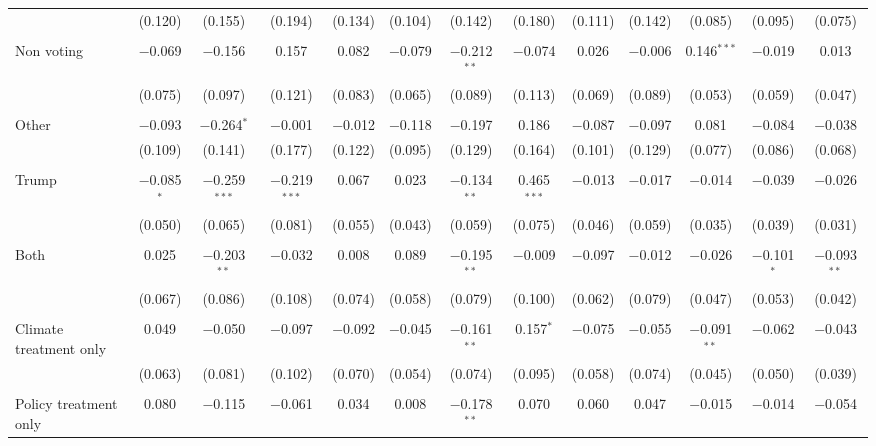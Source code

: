 \begin{tabular}{@{\extracolsep{5pt}}lcccccccccccc}
  & (0.120) & (0.155) & (0.194) & (0.134) & (0.104) & (0.142) & (0.180) & (0.111) & (0.142) & (0.085) & (0.095) & (0.075) \\ 
  & & & & & & & & & & & & \\ 
 Non voting & $-$0.069 & $-$0.156 & 0.157 & 0.082 & $-$0.079 & $-$0.212$^{**}$ & $-$0.074 & 0.026 & $-$0.006 & 0.146$^{***}$ & $-$0.019 & 0.013 \\ 
  & (0.075) & (0.097) & (0.121) & (0.083) & (0.065) & (0.089) & (0.113) & (0.069) & (0.089) & (0.053) & (0.059) & (0.047) \\ 
  & & & & & & & & & & & & \\ 
 Other & $-$0.093 & $-$0.264$^{*}$ & $-$0.001 & $-$0.012 & $-$0.118 & $-$0.197 & 0.186 & $-$0.087 & $-$0.097 & 0.081 & $-$0.084 & $-$0.038 \\ 
  & (0.109) & (0.141) & (0.177) & (0.122) & (0.095) & (0.129) & (0.164) & (0.101) & (0.129) & (0.077) & (0.086) & (0.068) \\ 
  & & & & & & & & & & & & \\ 
 Trump & $-$0.085$^{*}$ & $-$0.259$^{***}$ & $-$0.219$^{***}$ & 0.067 & 0.023 & $-$0.134$^{**}$ & 0.465$^{***}$ & $-$0.013 & $-$0.017 & $-$0.014 & $-$0.039 & $-$0.026 \\ 
  & (0.050) & (0.065) & (0.081) & (0.055) & (0.043) & (0.059) & (0.075) & (0.046) & (0.059) & (0.035) & (0.039) & (0.031) \\ 
  & & & & & & & & & & & & \\ 
 Both & 0.025 & $-$0.203$^{**}$ & $-$0.032 & 0.008 & 0.089 & $-$0.195$^{**}$ & $-$0.009 & $-$0.097 & $-$0.012 & $-$0.026 & $-$0.101$^{*}$ & $-$0.093$^{**}$ \\ 
  & (0.067) & (0.086) & (0.108) & (0.074) & (0.058) & (0.079) & (0.100) & (0.062) & (0.079) & (0.047) & (0.053) & (0.042) \\ 
  & & & & & & & & & & & & \\ 
 Climate treatment only & 0.049 & $-$0.050 & $-$0.097 & $-$0.092 & $-$0.045 & $-$0.161$^{**}$ & 0.157$^{*}$ & $-$0.075 & $-$0.055 & $-$0.091$^{**}$ & $-$0.062 & $-$0.043 \\ 
  & (0.063) & (0.081) & (0.102) & (0.070) & (0.054) & (0.074) & (0.095) & (0.058) & (0.074) & (0.045) & (0.050) & (0.039) \\ 
  & & & & & & & & & & & & \\ 
 Policy treatment only & 0.080 & $-$0.115 & $-$0.061 & 0.034 & 0.008 & $-$0.178$^{**}$ & 0.070 & 0.060 & 0.047 & $-$0.015 & $-$0.014 & $-$0.054 \\ 

\end{tabular}
